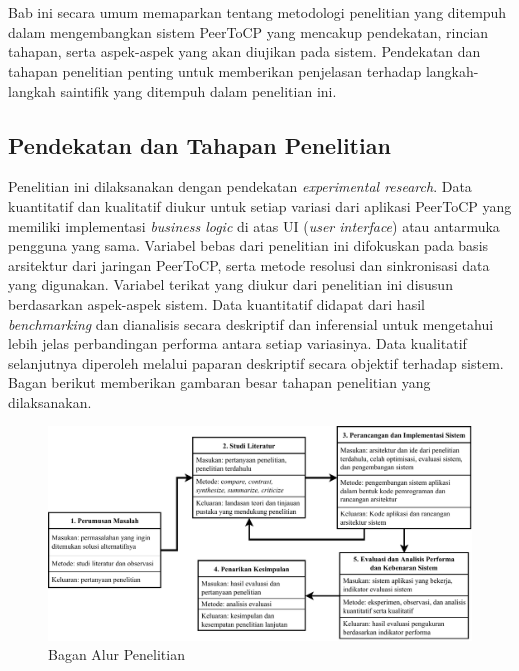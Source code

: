 \chapter{\babTiga}
\label{bab:3}

Bab ini secara umum memaparkan tentang metodologi penelitian yang ditempuh dalam mengembangkan sistem PeerToCP yang mencakup pendekatan, rincian tahapan, serta aspek-aspek yang akan diujikan pada sistem. Pendekatan dan tahapan penelitian penting untuk memberikan penjelasan terhadap langkah-langkah saintifik yang ditempuh dalam penelitian ini.


\section{Pendekatan dan Tahapan Penelitian}
\label{sec:pendekatan}
Penelitian ini dilaksanakan dengan pendekatan \textit{experimental research}. Data kuantitatif dan kualitatif diukur untuk setiap variasi dari aplikasi PeerToCP yang memiliki implementasi \textit{business logic} di atas UI (\textit{user interface}) atau antarmuka pengguna yang sama. Variabel bebas dari penelitian ini difokuskan pada basis arsitektur dari jaringan PeerToCP, serta metode resolusi dan sinkronisasi data yang digunakan. Variabel terikat yang diukur dari penelitian ini disusun berdasarkan aspek-aspek sistem. Data kuantitatif didapat dari hasil \textit{benchmarking} dan dianalisis secara deskriptif dan inferensial untuk mengetahui lebih jelas perbandingan performa antara setiap variasinya. Data kualitatif selanjutnya diperoleh melalui paparan deskriptif secara objektif terhadap sistem. Bagan berikut memberikan gambaran besar tahapan penelitian yang dilaksanakan.

\begin{figure}
    \centering
    \includegraphics[scale=0.69]{assets/skripsi/Metode_Penelitian}
    \caption{Bagan Alur Penelitian}
    \label{bagan}
\end{figure}

